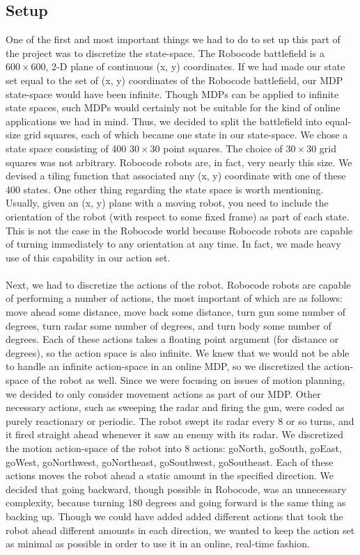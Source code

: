 \documentclass{aiaa-tc}%
\begin{document}
\subsection{Setup}
One of the first and most important things we had to do to set up this part of the project was to discretize the state-space. The Robocode battlefield is a $600 \times 600$, 2-D plane of continuous (x, y) coordinates. If we had made our state set equal to the set of (x, y) coordinates of the Robocode battlefield, our MDP state-space would have been infinite. Though MDPs can be applied to infinite state spaces, such MDPs would certainly not be suitable for the kind of online applications we had in mind. Thus, we decided to split the battlefield into equal-size grid squares, each of which became one state in our state-space. We chose a state space consisting of 400 $30 \times 30$ point squares. The choice of $30 \times 30$ grid squares was not arbitrary. Robocode robots are, in fact, very nearly this size. We devised a tiling function that associated any (x, y) coordinate with one of these 400 states. One other thing regarding the state space is worth mentioning. Usually, given an (x, y) plane with a moving robot, you need to include the orientation of the robot (with respect to some fixed frame) as part of each state. This is not the case in the Robocode world because Robocode robots are capable of turning immediately to any orientation at any time. In fact, we made heavy use of this capability in our action set. \\ \\
Next, we had to discretize the actions of the robot. Robocode robots are capable of performing a number of actions, the most important of which are as follows: move ahead some distance, move back some distance, turn gun some number of degrees, turn radar some number of degrees, and 
turn body some number of degrees. Each of these actions takes a floating point argument (for distance or degrees), so the action space is also infinite. We knew that we would not be able to handle an infinite action-space in an online MDP, so we discretized the  action-space of the robot
as well. Since we were focusing on issues of motion planning, we decided to only consider movement actions as part of our MDP. Other necessary actions, such as sweeping the radar and firing the gun, were coded as purely reactionary or periodic. The robot swept its radar every 8 or so turns, and it fired straight ahead whenever it saw an enemy with its radar. We discretized the motion action-space of the robot into 8 actions: goNorth, goSouth, goEast, goWest, goNorthwest, goNortheast, goSouthwest, goSoutheast. Each of these actions moves the robot ahead a static amount in the specified direction. We decided that going backward, though possible in Robocode, was an unnecessary complexity, because turning 180 degrees and going forward is the same thing as backing up. Though we could have added added different actions that took the robot ahead different amounts in each direction, we wanted to keep the action set as minimal as possible in order to use it in an online, real-time fashion.
\end{document}
